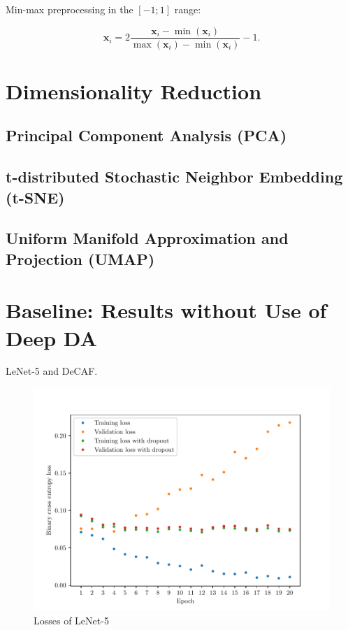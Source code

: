 Min-max preprocessing in the \([-1; 1]\) range:

\begin{equation}
	\mathbf{x}_i = 2 \frac{\mathbf{x}_i - \min(\mathbf{x}_i)}{
		\max(\mathbf{x}_i) - \min(\mathbf{x}_i)} - 1.
\end{equation}

\section{Dimensionality Reduction}

\subsection{Principal Component Analysis (PCA)}

\subsection{t-distributed Stochastic Neighbor Embedding (t-SNE)}

\subsection{Uniform Manifold Approximation and Projection (UMAP)}

\section{Baseline: Results without Use of Deep DA}

LeNet-5 and DeCAF.

\begin{figure}
	\includegraphics[width=\textwidth]{img/lenet_losses.pdf}
	\caption{Losses of LeNet-5}
	\label{lenet_losses}
\end{figure}

